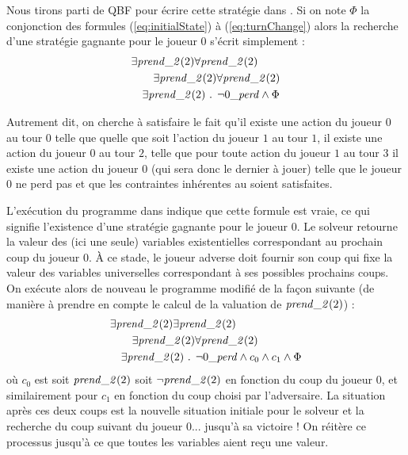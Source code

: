 Nous tirons parti de QBF pour écrire cette stratégie dans \touist. Si on note $\Phi$ la conjonction des formules (\ref{eq:initialState}) à (\ref{eq:turnChange}) alors la recherche d'une stratégie gagnante pour le joueur $0$ s'écrit simplement :
\vspace{-0.2cm}
\begin{align}
\begin{split}
&\exists \takes{0}
\forall \takes{1}\\
&\qquad\exists \takes{2}
\forall \takes{3} \\
&\quad\exists \takes{4}\text{ . }\neg \lost \land \Phi
\end{split}
\end{align}

\noindent
Autrement dit, on cherche à satisfaire le fait qu'il existe une action du joueur $0$ au tour $0$ telle que quelle que soit l'action du joueur $1$ au tour $1$, il existe une action du joueur $0$ au tour $2$, telle que pour toute action du joueur $1$ au tour $3$ il existe une action du joueur $0$ (qui sera donc le dernier à jouer) telle que le joueur $0$ ne perd pas et que les contraintes inhérentes au \game soient satisfaites.


L'exécution du programme dans \touist indique que cette formule est vraie, ce qui signifie l'existence d'une stratégie gagnante pour le joueur $0$. Le solveur retourne la valeur des (ici une seule) variables existentielles correspondant au prochain coup du joueur $0$. À ce stade, le joueur adverse doit fournir son coup qui fixe la valeur des variables universelles correspondant à ses possibles prochains coups. On exécute alors de nouveau le programme modifié de la façon suivante (de manière à prendre en compte le calcul de la valuation de $\takes{0}$) :
\begin{align*}
\begin{split}
&\exists \takes{0}
\exists \takes{1}\\
&\qquad\exists \takes{2}
\forall \takes{3} \\
&\quad\exists \takes{4}\text{ . }\neg \lost \land c_0 \land c_1 \land  \Phi
\end{split}
\end{align*}
où $c_0$ est soit $\takes{0}$ soit $\neg \takes{0}$ en fonction du coup du joueur $0$, et similairement pour $c_1$ en fonction du coup choisi par l'adversaire. La  situation après ces deux coups est la nouvelle situation initiale pour le solveur et la recherche du coup suivant du joueur $0$... jusqu'à sa victoire ! On réitère ce processus jusqu'à ce que toutes les variables aient reçu une valeur. 

